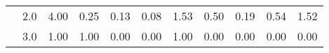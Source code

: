 \begin{tabular}{llrrrrrrrrr}
       & 2.0 &               4.00 &                     0.25 &                                 0.13 &                             0.08 &                           1.53 &                                               0.50 &                                            0.19 &                                            0.54 &                                        1.52 \\
       & 3.0 &               1.00 &                     1.00 &                                 0.00 &                             0.00 &                           1.00 &                                               0.00 &                                            0.00 &                                            0.00 &                                        0.00 \\
\bottomrule
\end{tabular}
